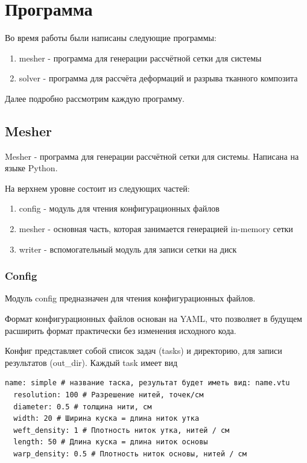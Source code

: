 \chapter*{Программа}

Во время работы были написаны следующие программы:
\begin{enumerate}
    \item mesher - программа для генерации рассчётной сетки для системы
    \item solver - программа для рассчёта деформаций и разрыва тканного композита
\end{enumerate}
Далее подробно рассмотрим каждую программу.

\section*{Mesher}
Mesher - программа для генерации рассчётной сетки для системы.
Написана на языке Python.

На верхнем уровне состоит из следующих частей:
\begin{enumerate}
    \item config - модуль для чтения конфигурационных файлов
    \item mesher - основная часть, которая занимается генерацией in-memory сетки
    \item writer - вспомогательный модуль для записи сетки на диск
\end{enumerate}

\subsection*{Config}
Модуль config предназначен для чтения конфигурационных файлов.

Формат конфигурационных файлов основан на YAML, что позволяет в будущем расширить формат практически без
изменения исходного кода.

Конфиг представляет собой список задач (tasks) и директорию, для записи результатов (out\_dir).
Каждый task имеет вид
\begin{verbatim}
name: simple # название таска, результат будет иметь вид: name.vtu
  resolution: 100 # Разрешение нитей, точек/см
  diameter: 0.5 # толщина нити, см
  width: 20 # Ширина куска = длина ниток утка
  weft_density: 1 # Плотность ниток утка, нитей / см
  length: 50 # Длина куска = длина ниток основы
  warp_density: 0.5 # Плотность ниток основы, нитей / см
\end{verbatim}

